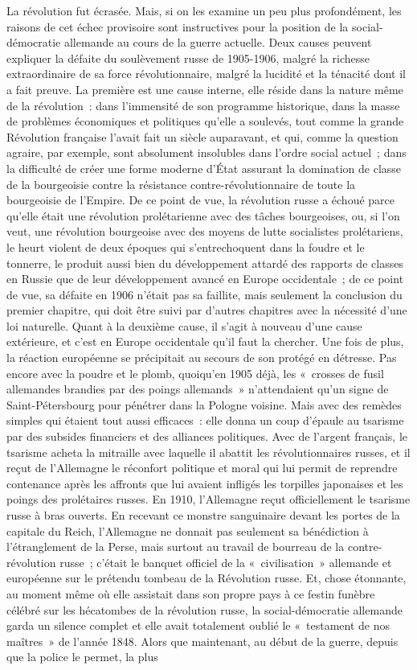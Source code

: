 \documentclass[french,twoside]{book} %
\begin{document}
La révolution fut écrasée. Mais, si on les examine un peu plus profondément, les raisons de cet échec provisoire sont instructives pour la position de la social-démocratie allemande au cours de la guerre actuelle. Deux causes peuvent expliquer la défaite du soulèvement russe de 1905-1906, malgré la richesse extraordinaire de sa force révolutionnaire, malgré la lucidité et la ténacité dont il a fait preuve. La première est une cause interne, elle réside dans la nature même de la révolution : dans l’immensité de son programme historique, dans la masse de problèmes économiques et politiques qu’elle a soulevés, tout comme la grande Révolution française l’avait fait un siècle auparavant, et qui, comme la question agraire, par exemple, sont absolument insolubles dans l’ordre social actuel ; dans la difficulté de créer une forme  moderne d’État assurant la domination de classe de la bourgeoisie contre la résistance contre-révolutionnaire de toute la bourgeoisie de l’Empire. De ce point de vue, la révolution russe a échoué parce qu’elle était une révolution prolétarienne avec des tâches bourgeoises, ou, si l’on veut, une révolution bourgeoise avec des moyens de lutte socialistes prolétariens, le heurt violent de deux époques qui s’entrechoquent dans la foudre et le tonnerre, le produit aussi bien du développement attardé des rapports de classes en Russie que de leur développement avancé en Europe occidentale ; de ce point de vue, sa défaite en 1906 n’était pas sa faillite, mais seulement la conclusion du premier chapitre, qui doit être suivi par d’autres chapitres avec la nécessité d’une loi naturelle. Quant à la deuxième cause, il s’agit à nouveau d’une cause extérieure, et c’est en Europe occidentale qu’il faut la chercher. Une fois de plus, la réaction européenne se précipitait au secours de son protégé en détresse. Pas encore avec la poudre et le plomb, quoiqu’en 1905 déjà, les « crosses de fusil allemandes brandies par des poings allemands » n’attendaient qu’un signe de Saint-Pétersbourg pour pénétrer dans la Pologne voisine. Mais avec des remèdes simples qui étaient tout aussi efficaces : elle donna un coup d’épaule au tsarisme par des subsides financiers et des alliances politiques. Avec de l’argent français, le tsarisme acheta la mitraille avec laquelle il abattit les révolutionnaires russes, et il reçut de l’Allemagne le réconfort politique et moral qui lui permit de reprendre contenance après les affronts que lui avaient infligés les torpilles japonaises et les poings des prolétaires russes. En 1910, l’Allemagne reçut officiellement le tsarisme russe à bras ouverts. En recevant ce monstre sanguinaire devant les portes de la capitale du Reich, l’Allemagne ne donnait pas seulement sa bénédiction à l’étranglement de la Perse, mais surtout au travail de bourreau de la contre-révolution russe ; c’était le banquet officiel de la « civilisation » allemande et européenne sur le prétendu tombeau de la Révolution russe. Et, chose étonnante, au moment même où elle assistait dans son propre pays à ce festin funèbre célébré sur les hécatombes de la révolution russe, la social-démocratie allemande garda un silence complet et elle avait totalement oublié le « testament de nos maîtres » de l’année 1848. Alors que maintenant, au début de la guerre, depuis que la police le permet, la plus 
\end{document}

